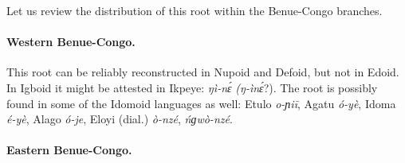 Let us review the distribution of this root within the Benue-Congo branches.

\paragraph*{Western Benue-Congo.}

This root can be reliably reconstructed in Nupoid and Defoid, but not in Edoid. In Igboid it might be attested in Ikpeye: \textit{ŋì-n{\'{ɛ}}} \textit{(ŋ-ìn{\'{ɛ}}}?). The root is possibly found in some of the Idomoid languages as well: Etulo \textit{o-ɲiī}, Agatu \textit{ó-yè}, Idoma \textit{é-yè}, Alago \textit{ó-je}, Eloyi (dial.) \textit{ò-nzé}, \textit{ńɡwò-nzé}. 

\paragraph*{Eastern Benue-Congo.}

